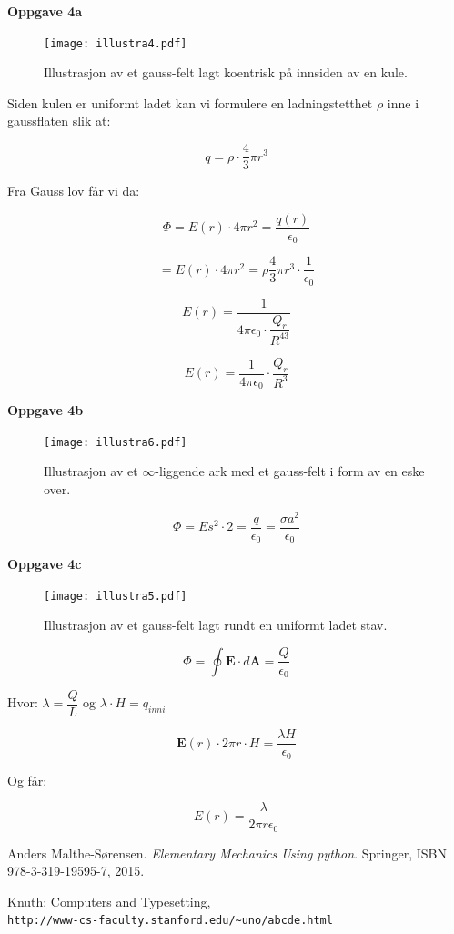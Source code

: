 \documentclass[a4paper,norsk,12pt]{article}
\begin{document}
\textbf{Oppgave 4a}

\begin{figure}[H]
\centering
  \texttt{[image: illustra4.pdf]}
  \caption{Illustrasjon av et gauss-felt lagt koentrisk på innsiden av en kule.}
  \label{fig:plot10}
\end{figure}

Siden kulen er uniformt ladet kan vi formulere en ladningstetthet $\rho$ inne i gaussflaten slik at: 

$$ q = \rho \cdot \dfrac{4}{3} \pi r^{3} $$

Fra Gauss lov får vi da:

$$ \Phi = E(r) \cdot 4 \pi r^2 = \dfrac{q(r)}{\epsilon_0} $$

$$ = E(r) \cdot 4 \pi r^2 = \rho \dfrac{4}{3} \pi r^3 \cdot \dfrac{1}{\epsilon_0} $$

$$ E(r) = \dfrac{1}{4 \pi \epsilon_0 \cdot \dfrac{Q_r}{R^43}} $$

$$ E(r) = \dfrac{1}{4 \pi \epsilon_0} \cdot \dfrac{Q_r}{R^3} $$

\textbf{Oppgave 4b}

\begin{figure}[H]
\centering
  \texttt{[image: illustra6.pdf]}
  \caption{Illustrasjon av et $\infty$-liggende ark med et gauss-felt i form av en eske over.}
  \label{fig:plot11}
\end{figure}

$$ \Phi = E s^2 \cdot 2 = \dfrac{q}{\epsilon_0} = \dfrac{\sigma a^2}{\epsilon_0} $$

\textbf{Oppgave 4c}

\begin{figure}[H]
\centering
  \texttt{[image: illustra5.pdf]}
  \caption{Illustrasjon av et gauss-felt lagt rundt en uniformt ladet stav.}
  \label{fig:plot12}
\end{figure}

$$ \Phi = \oint \textbf{E} \cdot d \textbf{A} = \dfrac{Q}{\epsilon_0} $$

Hvor: $ \lambda = \dfrac{Q}{L}$ og  $ \lambda \cdot H = q_{inni} $

$$ \textbf{E} (r) \cdot 2 \pi r \cdot H = \dfrac{\lambda H}{\epsilon_0} $$

Og får:

$$ E(r) = \dfrac{\lambda}{2 \pi r \epsilon_0} $$

\medskip
 
\begin{thebibliography}{9}
 
Anders Malthe-Sørensen. 
\textit{Elementary Mechanics Using python}. 
Springer, ISBN 978-3-319-19595-7, 2015.
 
Knuth: Computers and Typesetting,
\\\texttt{http://www-cs-faculty.stanford.edu/\~{}uno/abcde.html}
\end{thebibliography}
\end{document}
